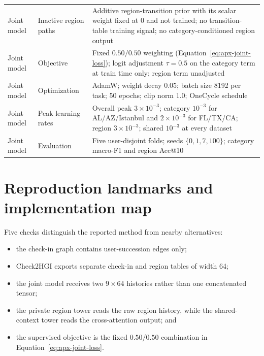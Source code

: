 {\begin{longtable}{>{\raggedright\arraybackslash}p{}
                  >{\raggedright\arraybackslash}p{}
                  >{\raggedright\arraybackslash}p{}}
Joint model & Inactive region paths & Additive region-transition prior with its scalar weight fixed at 0 and not trained; no transition-table training signal; no category-conditioned region output \\
Joint model & Objective & Fixed $0.50/0.50$ weighting (Equation~\ref{eq:apx-joint-loss}); logit adjustment $\tau=0.5$ on the category term at train time only; region term unadjusted \\
Joint model & Optimization & AdamW; weight decay $0.05$; batch size 8192 per task; 50 epochs; clip norm $1.0$; OneCycle schedule \\
Joint model & Peak learning rates & Overall peak $3\times10^{-3}$; category $10^{-3}$ for AL/AZ/Istanbul and $2\times10^{-3}$ for FL/TX/CA; region $3\times10^{-3}$; shared $10^{-3}$ at every dataset \\
Joint model & Evaluation & Five user-disjoint folds; seeds $\{0,1,7,100\}$; category macro-F1 and region Acc@10 \\
\bottomrule
\end{longtable}
}

\section{Reproduction landmarks and implementation map}
\label{sec:apx-methods-reproduction}

Five checks distinguish the reported method from nearby alternatives:
\begin{itemize}
    \item the check-in graph contains user-succession edges only;
    \item Check2HGI exports separate check-in and region tables of width 64;
    \item the joint model receives two $9\times64$ histories rather than one
    concatenated tensor;
    \item the private region tower reads the raw region history, while the
    shared-context tower reads the cross-attention output; and
    \item the supervised objective is the fixed $0.50/0.50$ combination in
    Equation~\ref{eq:apx-joint-loss}.
\end{itemize}

